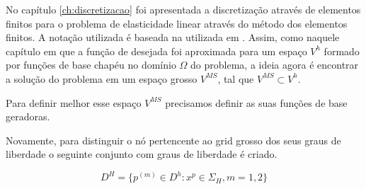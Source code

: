 No capítulo \ref{ch:discretizacao} foi apresentada a discretização através de elementos finitos para o problema de elasticidade linear através do método dos elementos finitos. A notação utilizada é baseada na utilizada em \cite{mbuck}. Assim, como naquele capítulo em que a função de desejada foi aproximada para um espaço $V^h$ formado por funções de base chapéu no domínio $\Omega$ do problema, a ideia agora é encontrar a solução do problema em um espaço grosso $V^{MS}$, tal que $V^{MS} \subset V^h$. 



Para definir melhor esse espaço $V^{MS}$ precisamos definir as suas funções de base geradoras. 


Novamente, para distinguir o nó pertencente ao grid grosso dos seus graus de liberdade o seguinte conjunto com graus de liberdade é criado.


\begin{equation}
    D^H = \{ p^{(m)} \in D^h : x^p \in \Sigma_H, m=1,2\}
\end{equation}


